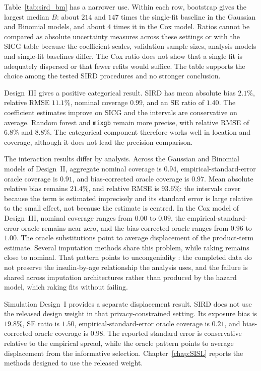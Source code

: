 Table~\ref{tab:sird_bm} has a narrower use. Within each row, bootstrap gives the largest median \(B\): about \(214\) and \(147\) times the single-fit baseline in the Gaussian and Binomial models, and about \(4\) times it in the Cox model. Ratios cannot be compared as absolute uncertainty measures across these settings or with the SICG table because the coefficient scales, validation-sample sizes, analysis models and single-fit baselines differ. The Cox ratio does not show that a single fit is adequately dispersed or that fewer refits would suffice. The table supports the choice among the tested SIRD procedures and no stronger conclusion.

Design~III gives a positive categorical result. SIRD has mean absolute bias \(2.1\%\), relative RMSE \(11.1\%\), nominal coverage \(0.99\), and an SE ratio of \(1.40\). The coefficient estimates improve on SICG and the intervals are conservative on average. Random forest and \texttt{mixgb} remain more precise, with relative RMSE of \(6.8\%\) and \(8.8\%\). The categorical component therefore works well in location and coverage, although it does not lead the precision comparison.

The interaction results differ by analysis. Across the Gaussian and Binomial models of Design~II, aggregate nominal coverage is \(0.94\), empirical-standard-error oracle coverage is \(0.91\), and bias-corrected oracle coverage is \(0.97\). Mean absolute relative bias remains \(21.4\%\), and relative RMSE is \(93.6\%\): the intervals cover because the term is estimated imprecisely and its standard error is large relative to the small effect, not because the estimate is centred. In the Cox model of Design~III, nominal coverage ranges from \(0.00\) to \(0.09\), the empirical-standard-error oracle remains near zero, and the bias-corrected oracle ranges from \(0.96\) to \(1.00\). The oracle substitutions point to average displacement of the product-term estimate. Several imputation methods share this problem, while raking remains close to nominal. That pattern points to uncongeniality \citep{meng1994multiple}: the completed data do not preserve the insulin-by-age relationship the analysis uses, and the failure is shared across imputation architectures rather than produced by the hazard model, which raking fits without failing.

Simulation Design~I provides a separate displacement result. SIRD does not use the released design weight in that privacy-constrained setting. Its exposure bias is \(19.8\%\), SE ratio is \(1.50\), empirical-standard-error oracle coverage is \(0.21\), and bias-corrected oracle coverage is \(0.98\). The reported standard error is conservative relative to the empirical spread, while the oracle pattern points to average displacement from the informative selection. Chapter~\ref{chap:SISL} reports the methods designed to use the released weight.

